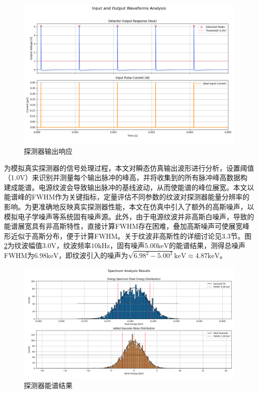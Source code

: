 \documentclass[twocolumn]{ctexart}
\begin{document}
\begin{figure}[htbp]
    \centering
    \includegraphics[width=\linewidth]{./circ_sim_response.png}
    \caption{探测器输出响应}
    \label{fig:circ_sim_response}
\end{figure}

为模拟真实探测器的信号处理过程，本文对瞬态仿真输出波形进行分析，设置阈值（1.0V）来识别并测量每个输出脉冲的峰高，并将收集到的所有脉冲峰高数据构建成能谱。电源纹波会导致输出脉冲的基线波动，从而使能谱的峰位展宽。本文以能谱峰的FWHM作为关键指标，定量评估不同参数的纹波对探测器能量分辨率的影响。为更准确地反映真实探测器性能，本文在仿真中引入了额外的高斯噪声，以模拟电子学噪声等系统固有噪声源。此外，由于电源纹波并非高斯白噪声，导致的能谱展宽具有非高斯特性，直接计算FWHM存在困难，叠加高斯噪声可使展宽峰形近似于高斯分布，便于计算FWHM。关于纹波非高斯性的详细讨论见3.3节。图\ref{fig:circ_sim_fwhm}为纹波幅值$3.0\mathrm{V}$，纹波频率$10\mathrm{kHz}$，固有噪声$5.00\mathrm{keV}$的能谱结果，测得总噪声FWHM为$6.98\mathrm{keV}$，即纹波引入的噪声为$\sqrt{6.98^2-5.00^2}\mathrm{keV}\approx4.87\mathrm{keV}$。

\begin{figure}[htbp]
    \centering
    \includegraphics[width=\linewidth]{./circ_sim_fwhm.png}
    \caption{探测器能谱结果}
    \label{fig:circ_sim_fwhm}
\end{figure}
\end{document}
